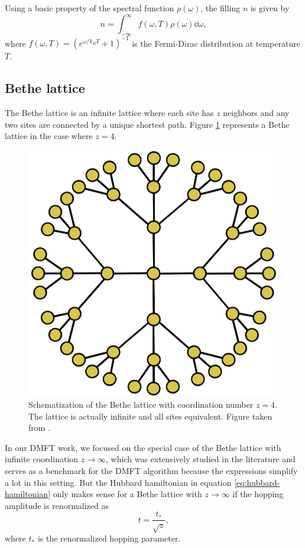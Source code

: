 \documentclass[12pt]{report}
\begin{document}
Using a basic property of the spectral function $\rho(\omega)$, the filling $n$ is given by \cite{bruus}
\begin{equation} \label{eq:filling}
n = \int_{-\infty}^{\infty} f(\omega, T) \rho(\omega) \dd{\omega},
\end{equation}
where $f(\omega, T) = (e^{\omega/k_B T} + 1)^{-1}$ is the Fermi-Dirac distribution at temperature $T$.

\subsection{Bethe lattice} \label{sec:bethe}

The Bethe lattice is an infinite lattice where each site has $z$ neighbors and any two sites are connected by a unique shortest path. Figure \ref{fig:bethe-lattice} represents a Bethe lattice in the case where $z = 4$.
\begin{figure}[H]
\centering
\includegraphics[width=0.4\linewidth]{fig/bethe-lattice.png}
\caption{Schematization of the Bethe lattice with coordination number $z = 4$. The lattice is actually infinite and all sites equivalent. Figure taken from \cite{thesis_dmft_graz}.}
\label{fig:bethe-lattice}
\end{figure}

In our DMFT work, we focused on the special case of the Bethe lattice with infinite coordination $z\to\infty$, which was extensively studied in the literature \cite{georges1996, thesis_dmft_graz} and serves as a benchmark for the DMFT algorithm because the expressions simplify a lot in this setting. But the Hubbard hamiltonian in equation \ref{eq:hubbard-hamiltonian} only makes sense for a Bethe lattice with $z\to\infty$ if the hopping amplitude is renormalized as \cite{thesis_bruno}
\begin{equation} \label{eq:hopping-renormalization}
t = \frac{t_*}{\sqrt{z}},
\end{equation}
where $t_*$ is the renormalized hopping parameter.
\end{document}
